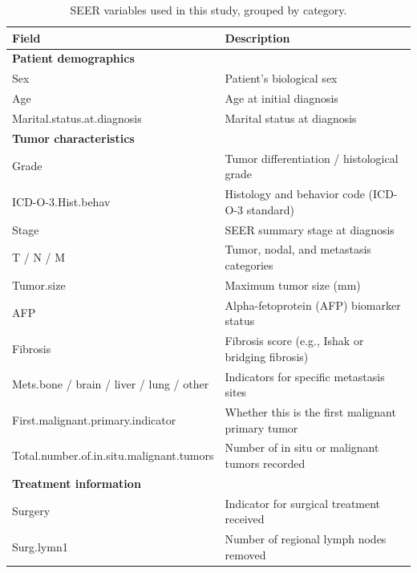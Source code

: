 \documentclass{article}
\begin{document}
\begin{table}[t]
\renewcommand{\arraystretch}{1.25} %
\centering
\caption{SEER variables used in this study, grouped by category.}
\label{tab:seer_fields_grouped}
\begin{tabular}{p{6cm} p{7.5cm}}
\toprule
\textbf{Field} & \textbf{Description} \\
\midrule
\multicolumn{2}{l}{\textbf{Patient demographics}} \\
Sex & Patient's biological sex \\
Age & Age at initial diagnosis \\
Marital.status.at.diagnosis & Marital status at diagnosis \\
\hline
\multicolumn{2}{l}{\textbf{Tumor characteristics}} \\
Grade & Tumor differentiation / histological grade \\
ICD-O-3.Hist.behav & Histology and behavior code (ICD-O-3 standard) \\
Stage & SEER summary stage at diagnosis \\
T / N / M & Tumor, nodal, and metastasis categories\\
Tumor.size & Maximum tumor size (mm) \\
AFP & Alpha-fetoprotein (AFP) biomarker status \\
Fibrosis & Fibrosis score (e.g., Ishak or bridging fibrosis) \\
Mets.bone / brain / liver / lung / other & Indicators for specific metastasis sites \\
First.malignant.primary.indicator & Whether this is the first malignant primary tumor \\
Total.number.of.in.situ.malignant.tumors & Number of in situ or malignant tumors recorded \\
\hline
\multicolumn{2}{l}{\textbf{Treatment information}} \\
Surgery & Indicator for surgical treatment received \\
Surg.lymn1 & Number of regional lymph nodes removed \\

\end{tabular}
\end{table}
\end{document}
